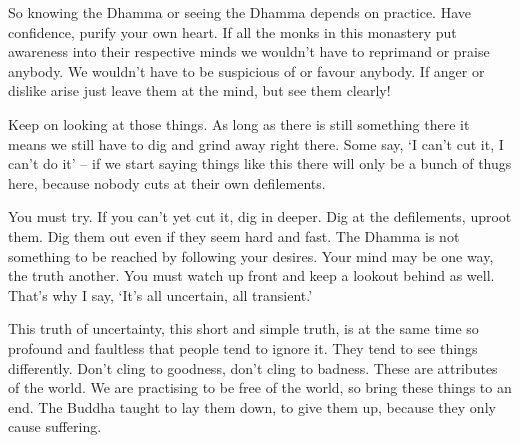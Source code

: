 So knowing the Dhamma or seeing the Dhamma depends on practice. Have confidence, purify your own heart. If all the monks in this monastery put awareness into their respective minds we wouldn't have to reprimand or praise anybody. We wouldn't have to be suspicious of or favour anybody. If anger or dislike arise just leave them at the mind, but see them clearly! 

Keep on looking at those things. As long as there is still something there it means we still have to dig and grind away right there. Some say, `I can't cut it, I can't do it' -- if we start saying things like this there will only be a bunch of thugs here, because nobody cuts at their own defilements. 

You must try. If you can't yet cut it, dig in deeper. Dig at the defilements, uproot them. Dig them out even if they seem hard and fast. The Dhamma is not something to be reached by following your desires. Your mind may be one way, the truth another. You must watch up front and keep a lookout behind as well. That's why I say, `It's all uncertain, all transient.' 

This truth of uncertainty, this short and simple truth, is at the same time so profound and faultless that people tend to ignore it. They tend to see things differently. Don't cling to goodness, don't cling to badness. These are attributes of the world. We are practising to be free of the world, so bring these things to an end. The Buddha taught to lay them down, to give them up, because they only cause suffering. 

